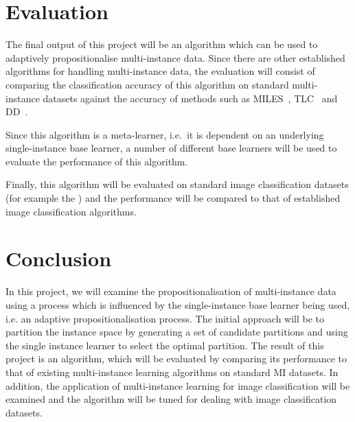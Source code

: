\documentclass[a4paper,12pt]{article} %
\begin{document}
\section{Evaluation}

The final output of this project will be an algorithm which can be used to adaptively propositionalise multi-instance data. Since there are other established algorithms for handling multi-instance data, the evaluation will consist of comparing the classification accuracy of this algorithm on standard multi-instance datasets against the accuracy of methods such as MILES~\cite{Chen2006}, TLC~\cite{Weidmann2003} and DD~\cite{Maron98mil}.

Since this algorithm is a meta-learner, i.e.\ it is dependent on an underlying single-instance base learner, a number of different base learners will be used to evaluate the performance of this algorithm.
 
Finally, this algorithm will be evaluated on standard image classification datasets (for example the ) and the performance will be compared to that of established image classification algorithms.

\section{Conclusion}

In this project, we will examine the propositionalisation of multi-instance data using a process which is influenced by the single-instance base learner being used, i.e. an adaptive propositionalisation process. The initial approach will be to partition the instance space by generating a set of candidate partitions and using the single instance learner to select the optimal partition. 
The result of this project is an algorithm, which will be evaluated by comparing its performance to that of existing multi-instance learning algorithms on standard MI datasets. 
In addition, the application of multi-instance learning for image classification will be examined and the algorithm will be tuned for dealing with image classification datasets.
\clearpage
 

\end{document}
